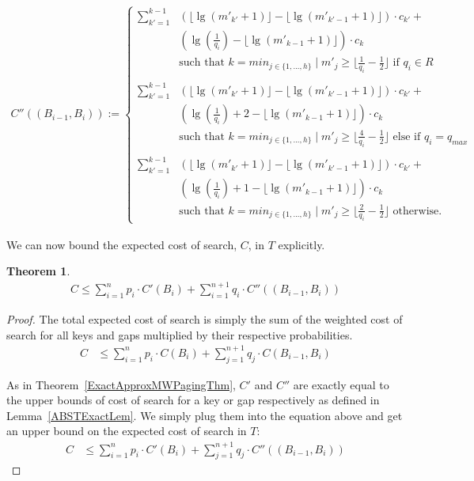 \documentclass[letterpaper,12pt,titlepage,oneside,final]{book}
\theoremstyle{plain}
\newtheorem{thm}{Theorem}[section]
\begin{document}
\begin{align*}
C''((B_{i-1},B_i)) :=
\begin{cases}
 \sum_{k'=1}^{k-1} &\left(\lfloor \lg(m'_{k'}+1) \rfloor - \lfloor \lg(m'_{k'-1}+1) \rfloor \right)\cdot c_{k'}+ \\
 &\left(\lg(\frac{1}{q_i}) - \lfloor \lg(m'_{k-1}+1) \rfloor \right)\cdot c_k\\
&\text{such that } k=min_{j \in \{1, ..., h\}} \mid m'_j \geq \lfloor \frac{1}{q_i}-\frac{1}{2} \rfloor \text{ if } q_i \in R  \\\\
  \sum_{k'=1}^{k-1} &\left(\lfloor \lg(m'_{k'}+1) \rfloor - \lfloor \lg(m'_{k'-1}+1) \rfloor \right)\cdot c_{k'}+ \\
 &\left(\lg(\frac{1}{q_i}) + 2 - \lfloor \lg(m'_{k-1}+1) \rfloor \right)\cdot c_k\\
&\text{such that } k=min_{j \in \{1, ..., h\}} \mid m'_j \geq \lfloor \frac{4}{q_i}-\frac{1}{2} \rfloor \text{ else if } q_i = q_{max}  \\\\
 \sum_{k'=1}^{k-1} &\left(\lfloor \lg(m'_{k'}+1) \rfloor - \lfloor \lg(m'_{k'-1}+1) \rfloor \right)\cdot c_{k'}+ \\
 &\left(\lg(\frac{1}{q_i})+1 - \lfloor \lg(m'_{k-1}+1) \rfloor \right)\cdot c_k\\
&\text{such that } k=min_{j \in \{1, ..., h\}} \mid m'_j \geq \lfloor \frac{2}{q_i}-\frac{1}{2} \rfloor \text{ otherwise.}
\end{cases}
\end{align*}

We can now bound the expected cost of search, $C$, in $T$ explicitly.

\begin{thm} \label{ExactApproxBSTPagingThm}
\begin{align*}
C \leq \sum_{i=1}^{n} p_i\cdot  C'(B_i) + \sum_{i=1}^{n+1} q_i\cdot C''((B_{i-1},B_i)) 
\end{align*}

\end{thm}

\begin{proof}
The total expected cost of search is simply the sum of the weighted cost of search for all keys and gaps multiplied by their respective probabilities.
\begin{align*}
C &\leq \sum_{i=1}^{n} p_i\cdot C(B_i) + \sum_{j=1}^{n+1} q_j\cdot C(B_{i-1},B_i) 
\end{align*}

As in Theorem~\ref{ExactApproxMWPagingThm}, $C'$ and $C''$ are exactly equal to the upper bounds of cost of search for a key or gap respectively as defined in Lemma~\ref{ABSTExactLem}. We simply plug them into the equation above and get an upper bound on the expected cost of search in $T$:
\begin{align*}
C &\leq \sum_{i=1}^{n} p_i\cdot C'(B_i) + \sum_{j=1}^{n+1} q_j\cdot C''((B_{i-1},B_i))
\end{align*}

\end{proof}
\end{document}

